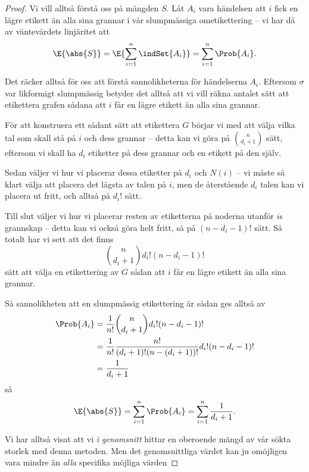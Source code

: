 \documentclass[nobib]{tufte-handout}
\begin{document}
\begin{theorem}
\begin{proof}
        Vi vill alltså förstå oss på mängden $S$. Låt $A_i$ vara händelsen att $i$ fick en lägre etikett än alla sina grannar i vår slumpmässiga ometikettering -- vi har då av väntevärdets linjäritet att
        $$\E{\abs{S}} = \E{\sum_{i=1}^{n} \indSet{A_i}} = \sum_{i=1}^{n} \Prob{A_i}.$$
        
        Det räcker alltså för oss att förstå sannolikheterna för händelserna $A_i$. Eftersom $\sigma$ var likformigt slumpmässig betyder det alltså att vi vill räkna antalet sätt att etikettera grafen sådana att $i$ får en lägre etikett än alla sina grannar.

        För att konstruera ett sådant sätt att etikettera $G$ börjar vi med att välja vilka tal som skall stå på $i$ och dess grannar -- detta kan vi göra på $\binom{n}{d_i + 1}$ sätt, eftersom vi skall ha $d_i$ etiketter på dess grannar och en etikett på den själv.

        Sedan väljer vi hur vi placerar dessa etiketter på $d_i$ och $N(i)$ -- vi måste så klart välja att placera det lägsta av talen på $i$, men de återstående $d_i$ talen kan vi placera ut fritt, och alltså på $d_i!$ sätt.

        Till slut väljer vi hur vi placerar resten av etiketterna på noderna utanför $i$s grannskap -- detta kan vi också göra helt fritt, så på $(n - d_i - 1)!$ sätt. Så totalt har vi sett att det finns
        $$\binom{n}{d_i + 1} d_i! (n - d_i - 1)!$$
        sätt att välja en etikettering av $G$ sådan att $i$ får en lägre etikett än alla sina grannar.

        Så sannolikheten att en slumpmässig etikettering är sådan ges alltså av
        \begin{align*}
            \Prob{A_i} &= \frac{1}{n!}\binom{n}{d_i + 1} d_i! (n - d_i - 1)!\\
            &= \frac{1}{n!}\frac{n!}{(d_i + 1)!(n - (d_i + 1))!}d_i! (n - d_i - 1)!\\
            &= \frac{1}{d_i + 1}
        \end{align*}
        så
        $$\E{\abs{S}} = \sum_{i=1}^{n} \Prob{A_i} = \sum_{i=1}^{n} \frac{1}{d_i + 1}.$$

        Vi har alltså visat att vi \emph{i genomsnitt} hittar en oberoende mängd av vår sökta storlek med denna metoden. Men det genomsnittliga värdet kan ju omöjligen vara mindre än \emph{alla} specifika möjliga värden
\end{proof}
\end{theorem}
\end{document}
